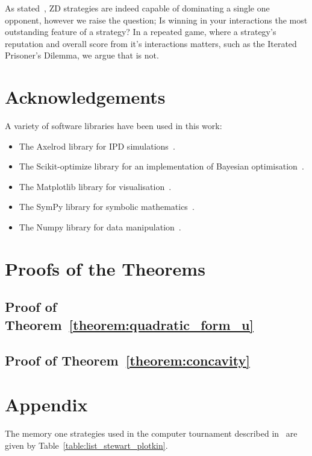 \documentclass[10pt]{article}
\begin{document}
As stated~\cite{Press2012}, ZD strategies are indeed capable of dominating a
single one opponent, however we raise the question; Is winning in your
interactions the most outstanding feature of a strategy? In a repeated game,
where a strategy's reputation and overall score from it's interactions matters,
such as the Iterated Prisoner's Dilemma, we argue that is not.

\section{Acknowledgements}

A variety of software libraries have been used in this work:

\begin{itemize}
    \item The Axelrod library for IPD simulations~\cite{axelrodproject}.
    \item The Scikit-optimize library for an implementation of Bayesian optimisation~\cite{tim_head_2018_1207017}.
    \item The Matplotlib library for visualisation~\cite{hunter2007matplotlib}.
    \item The SymPy library for symbolic mathematics~\cite{sympy}.
    \item The Numpy library for data manipulation~\cite{walt2011numpy}.
\end{itemize}





\begin{appendices}

\section{Proofs of the Theorems}\label{section:appendix_a}

\subsection{Proof of Theorem~\ref{theorem:quadratic_form_u}}


\subsection{Proof of Theorem~\ref{theorem:concavity}}\label{appendix:proof_theorem_three}


\section{Appendix}\label{section:appendix_b}

The memory one strategies used in the computer tournament described
in~\cite{Stewart2012} are given by Table~\ref{table:list_stewart_plotkin}.
    
\end{appendices}
\end{document}

